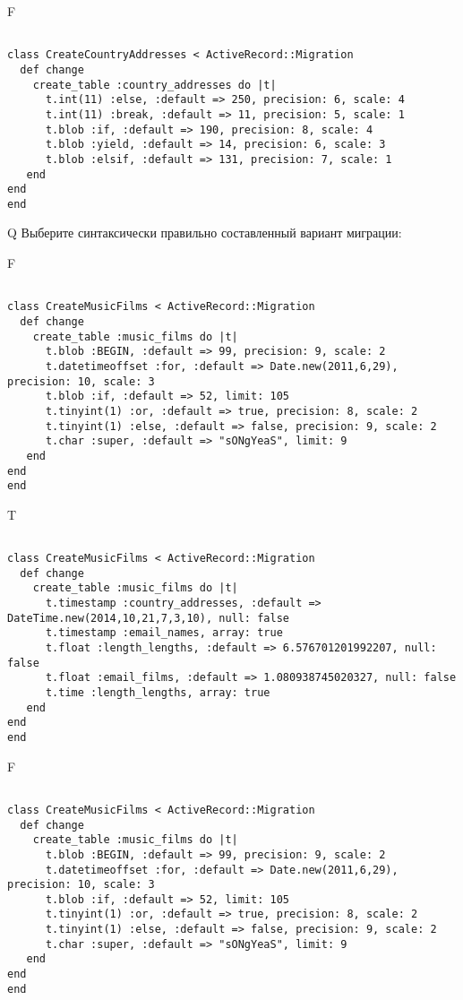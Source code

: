 F
\begin{verbatim}
		
class CreateCountryAddresses < ActiveRecord::Migration 
  def change 
    create_table :country_addresses do |t| 
      t.int(11) :else, :default => 250, precision: 6, scale: 4
      t.int(11) :break, :default => 11, precision: 5, scale: 1
      t.blob :if, :default => 190, precision: 8, scale: 4
      t.blob :yield, :default => 14, precision: 6, scale: 3
      t.blob :elsif, :default => 131, precision: 7, scale: 1
   end
end
end
\end{verbatim}

Q
Выберите синтаксически правильно составленный вариант миграции:

F
\begin{verbatim}
		
class CreateMusicFilms < ActiveRecord::Migration 
  def change 
    create_table :music_films do |t| 
      t.blob :BEGIN, :default => 99, precision: 9, scale: 2
      t.datetimeoffset :for, :default => Date.new(2011,6,29), precision: 10, scale: 3
      t.blob :if, :default => 52, limit: 105
      t.tinyint(1) :or, :default => true, precision: 8, scale: 2
      t.tinyint(1) :else, :default => false, precision: 9, scale: 2
      t.char :super, :default => "sONgYeaS", limit: 9
   end
end
end
\end{verbatim}

T
\begin{verbatim}
		
class CreateMusicFilms < ActiveRecord::Migration 
  def change 
    create_table :music_films do |t| 
      t.timestamp :country_addresses, :default => DateTime.new(2014,10,21,7,3,10), null: false
      t.timestamp :email_names, array: true
      t.float :length_lengths, :default => 6.576701201992207, null: false
      t.float :email_films, :default => 1.080938745020327, null: false
      t.time :length_lengths, array: true
   end
end
end
\end{verbatim}

F
\begin{verbatim}
		
class CreateMusicFilms < ActiveRecord::Migration 
  def change 
    create_table :music_films do |t| 
      t.blob :BEGIN, :default => 99, precision: 9, scale: 2
      t.datetimeoffset :for, :default => Date.new(2011,6,29), precision: 10, scale: 3
      t.blob :if, :default => 52, limit: 105
      t.tinyint(1) :or, :default => true, precision: 8, scale: 2
      t.tinyint(1) :else, :default => false, precision: 9, scale: 2
      t.char :super, :default => "sONgYeaS", limit: 9
   end
end
end
\end{verbatim}

